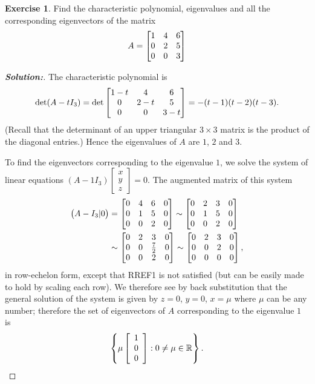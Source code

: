 \documentclass[a4paper]{amsart}
\theoremstyle{definition}
\newtheorem{exercise}{Exercise}
\newenvironment{solution}{\begin{proof}[\textbf{Solution:}] \vphantom{u}}{\end{proof}}
\begin{document}
\begin{exercise}\label{ex-evectors-i}
 Find the characteristic polynomial, eigenvalues and all the corresponding
 eigenvectors of the matrix
 \[ A = \left[\begin{matrix} 1 & 4 & 6 \\ 0 & 2 & 5 \\ 0 & 0 & 3 \end{matrix}\right] \]
\end{exercise}
\begin{solution}
 The characteristic polynomial is
    \[ \det (A - tI_3) =
    \det \left[\begin{matrix}
    1-t & 4 & 6 \\
    0 & 2-t & 5 \\
    0 & 0 & 3-t
    \end{matrix}\right]=-(t-1)(t-2)(t-3).
    \]
 (Recall that the determinant of an upper triangular $3 \times 3$
 matrix is the product of the diagonal entries.) Hence the
 eigenvalues of $A$ are $1$, $2$ and $3$.

 To find the eigenvectors corresponding to the eigenvalue $1$, we
 solve the system of linear equations $(A - 1I_3)\left[
 \begin{array}{c}x \\ y\\z
 \end{array} \right] = 0$. The augmented matrix of this system
 \begin{align*}
 \big(A - I_3|0\big) & = \left[\begin{matrix} 0& 4&
 6&0\\0&1&5&0\\0&0&2&0\end{matrix}\right] \sim \left[\begin{matrix} 0& 2&
 3&0\\0&1&5&0\\0&0&2&0\end{matrix}\right]\\& \sim \left[\begin{matrix} 0& 2&
 3&0\\0&0&\frac{7}{2}&0\\0&0&2&0\end{matrix}\right] \sim \left[\begin{matrix}
 0& 2& 3&0\\0&0&2&0\\0&0&0&0\end{matrix}\right],
 \end{align*}
 in row-echelon form, except that RREF1 is not satisfied (but
 can be easily made to hold by scaling each row).
 We therefore see by back substitution that
 the general solution of the system is given by $z = 0$, $y = 0$,
 $x = \mu$ where $\mu$ can be any number; therefore the set of
 eigenvectors of $A$ corresponding to the eigenvalue $1$ is
 \[
 \left\{ \mu \left[ \begin{array}{c} 1\\0\\0
 \end{array} \right] : 0 \neq \mu \in {\mathbb{R}} \right\}.
 \]


\end{solution}
\end{document}
